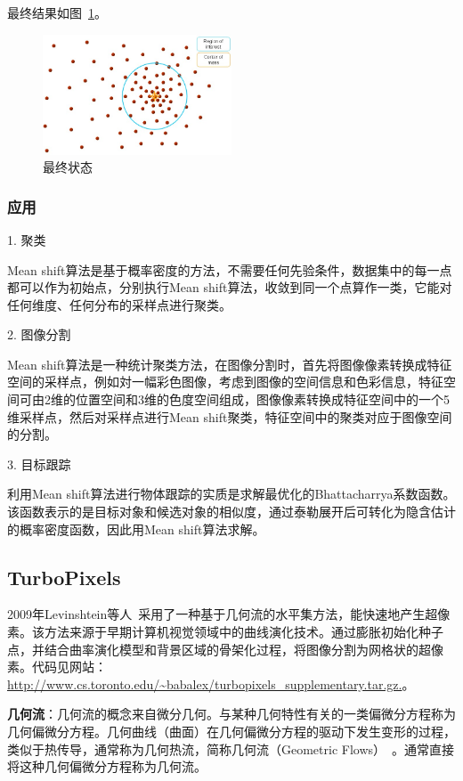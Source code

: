 \documentclass[12pt]{article}
\begin{document}
最终结果如图~\ref{fig: meanshift3}。

\begin{figure}[!ht]
\centering
\includegraphics[width=0.5\textwidth]{meanshift3.jpg}
\caption{最终状态}
\label{fig: meanshift3}
\end{figure} 

\subsubsection{应用}

1. 聚类

Mean shift算法是基于概率密度的方法，不需要任何先验条件，数据集中的每一点都可以作为初始点，分别执行Mean shift算法，收敛到同一个点算作一类，它能对任何维度、任何分布的采样点进行聚类。

2. 图像分割

Mean shift算法是一种统计聚类方法，在图像分割时，首先将图像像素转换成特征空间的采样点，例如対一幅彩色图像，考虑到图像的空间信息和色彩信息，特征空间可由2维的位置空间和3维的色度空间组成，图像像素转换成特征空间中的一个5维采样点，然后对采样点进行Mean shift聚类，特征空间中的聚类对应于图像空间的分割。

3. 目标跟踪

利用Mean shift算法进行物体跟踪的实质是求解最优化的Bhattacharrya系数函数\cite{fashing2005mean}。该函数表示的是目标对象和候选对象的相似度，通过泰勒展开后可转化为隐含估计的概率密度函数，因此用Mean shift算法求解。

\subsection{TurboPixels}

2009年Levinshtein等人~\cite{levinshtein2009turbopixels}采用了一种基于几何流的水平集方法，能快速地产生超像素。该方法来源于早期计算机视觉领域中的曲线演化技术。通过膨胀初始化种子点，并结合曲率演化模型和背景区域的骨架化过程，将图像分割为网格状的超像素。代码见网站：\url{http://www.cs.toronto.edu/~babalex/turbopixels_supplementary.tar.gz.}。

\textbf{几何流}：几何流的概念来自微分几何。与某种几何特性有关的一类偏微分方程称为几何偏微分方程。几何曲线（曲面）在几何偏微分方程的驱动下发生变形的过程，类似于热传导，通常称为几何热流，简称几何流（Geometric Flows）~\cite{sapiro2006geometric, bakas2005algebraic}。通常直接将这种几何偏微分方程称为几何流。
\end{document}
